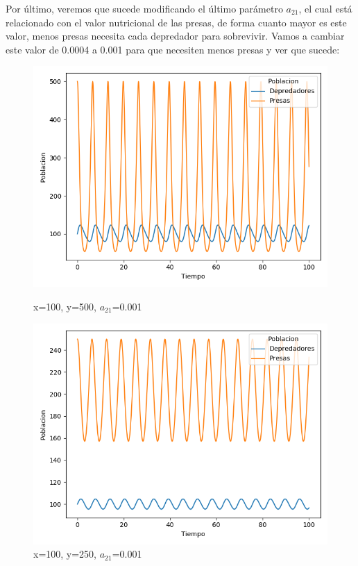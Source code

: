 \documentclass[11pt,a4paper]{article}
\begin{document}
\newpage
Por último, veremos que sucede modificando el último parámetro $a_{21}$, el cual está relacionado con el valor nutricional de las presas, de forma
cuanto mayor es este valor, menos presas necesita cada depredador para sobrevivir. Vamos a cambiar este valor de 0.0004 a 0.001 para que necesiten
menos presas y ver que sucede:
\begin{figure}[H]
	\centering
	\begin{minipage}{0.5\textwidth}
		\centering
		\includegraphics[scale=0.4]{img/4-a21-100-500.png}
		\caption{x=100, y=500, $a_{21}$=0.001}
	\end{minipage}%
	\begin{minipage}{0.5\textwidth}
		\centering
		\includegraphics[scale=0.4]{img/4-a21-100-250.png}
		\caption{x=100, y=250, $a_{21}$=0.001}
	\end{minipage}
\end{figure}
\end{document}
